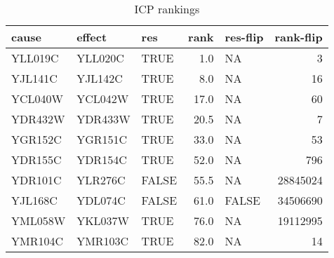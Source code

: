 \begin{table}

\caption{ICP rankings  \label{tab:ICP-ranks}}
\centering
\begin{tabular}[t]{lllrlr}
\toprule
cause & effect & res & rank & res-flip & rank-flip\\
\midrule
YLL019C & YLL020C & TRUE & 1.0 & NA & 3\\
YJL141C & YJL142C & TRUE & 8.0 & NA & 16\\
YCL040W & YCL042W & TRUE & 17.0 & NA & 60\\
YDR432W & YDR433W & TRUE & 20.5 & NA & 7\\
YGR152C & YGR151C & TRUE & 33.0 & NA & 53\\
\addlinespace
YDR155C & YDR154C & TRUE & 52.0 & NA & 796\\
YDR101C & YLR276C & FALSE & 55.5 & NA & 28845024\\
YJL168C & YDL074C & FALSE & 61.0 & FALSE & 34506690\\
YML058W & YKL037W & TRUE & 76.0 & NA & 19112995\\
YMR104C & YMR103C & TRUE & 82.0 & NA & 14\\
\bottomrule
\end{tabular}
\end{table}
